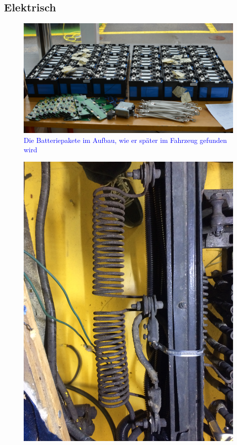\begin{landscape}\section{Elektrisch}

\begin{figure}[h]
	\centering
		\includegraphics[width=1.3\textwidth]{images/Anhang/Batteriepakete.jpg}
	\caption{\textcolor{blue}{Die Batteriepakete im Aufbau, wie er später im Fahrzeug gefunden wird}}
	\label{fig:Batteriepakete}
\end{figure}
\begin{figure}[h]
	\centering
		\includegraphics[angle=180,width=1.30\textwidth]{images/Anhang/Anfahrwiderstand.jpg}

\end{figure}
\end{landscape}
